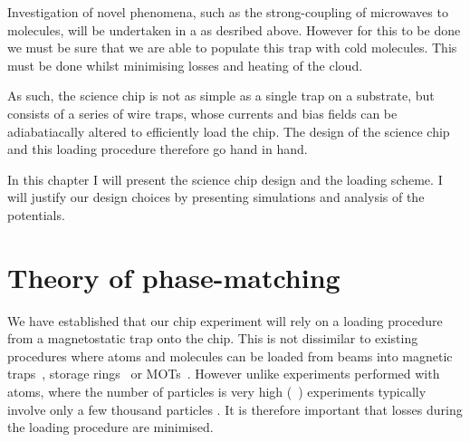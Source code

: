 
Investigation of novel phenomena, such as the strong-coupling of microwaves to
molecules, will be undertaken in a  as desribed above. However
for this to be done we must be sure that we are able to populate this trap with
cold molecules. This must be done whilst minimising losses and heating of the
cloud.

As such, the science chip is not as simple as a single trap on a substrate, but
consists of a series of wire traps, whose currents and bias fields can be
adiabatiacally altered to efficiently load the chip. The design of the science
chip and this loading procedure therefore go hand in hand.

In this chapter I will present the science chip design and the loading scheme.
I will justify our design choices by presenting simulations and analysis of the
potentials. 


\section{Theory of phase-matching}

We have established that our chip experiment will rely on a loading procedure
from a magnetostatic trap onto the chip. This is not dissimilar to existing
procedures where atoms and molecules can be loaded from beams into magnetic
traps~\cite{}, storage rings~\cite{} or MOTs~\cite{}. However unlike
experiments performed with atoms, where the number of particles is very high
(~\cite{}) \CaF experiments typically involve only a few thousand
particles \cite{}. It is therefore important that losses during the loading
procedure are minimised.


